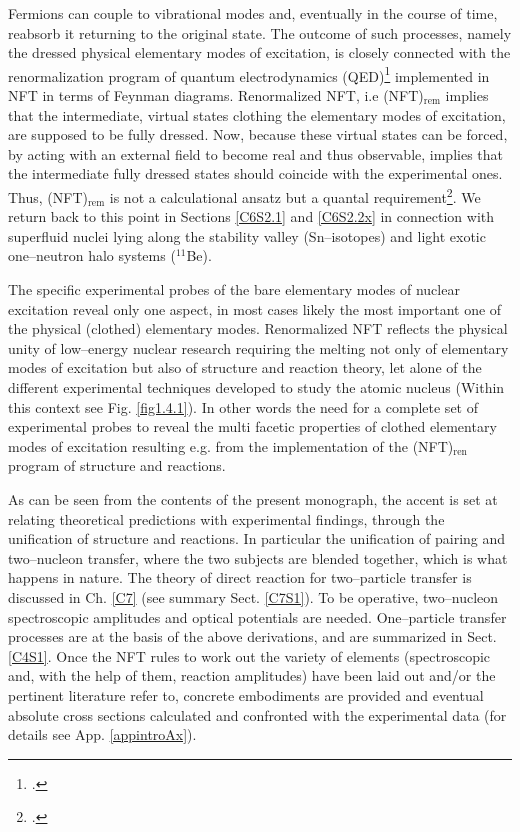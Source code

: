  
 Fermions  can   couple to  vibrational modes and, eventually   in the course of time, reabsorb it returning to the original state. The outcome of such processes, namely the dressed physical elementary modes of excitation, is closely connected with the renormalization program of quantum electrodynamics (QED)\footnote{\cite{Feynman:75,Schwinger:01}.} implemented in NFT in terms of Feynman diagrams. Renormalized NFT, i.e (NFT)$_{\text{rem}}$ implies that the intermediate, virtual states clothing the elementary modes of excitation, are supposed to be fully dressed. Now, because these virtual states can be forced, by acting with an external field to become real and thus observable, implies that the intermediate fully dressed states should coincide with the experimental ones. Thus, (NFT)$_{\text{rem}}$ is not a calculational ansatz but a quantal requirement\footnote{\cite{Broglia:16,Idini:15,Barranco:17}.}. We return back to this point in Sections \ref{C6S2.1} and \ref{C6S2.2x} in connection with superfluid nuclei lying along the stability valley  (Sn--isotopes) and light exotic one--neutron halo systems ($^{11}$Be).
  
 
  The specific experimental probes of the bare elementary modes of nuclear excitation reveal only one aspect, in most cases likely the most important one of the physical (clothed) elementary modes. Renormalized NFT  reflects the physical unity of  low--energy nuclear research requiring the melting not only of elementary modes of excitation but also of structure and reaction theory, let alone of the different experimental techniques developed to study the atomic nucleus (Within this context see  Fig. \ref{fig1.4.1}). In other words the need for a complete set of experimental probes to reveal the multi facetic properties of clothed elementary modes of excitation resulting e.g. from the implementation of the (NFT)$_{\text{ren}}$ program of structure and reactions.


As can be seen from the contents of the present monograph, the accent is set at relating theoretical predictions with experimental findings, through the unification of structure and reactions. In particular the unification of pairing and two--nucleon transfer, where the two subjects are blended together, which is what happens in nature.
The theory of direct reaction for two--particle transfer is discussed in Ch. \ref{C7} (see summary Sect. \ref{C7S1}). To be operative, two--nucleon spectroscopic amplitudes and optical potentials are needed. One--particle transfer processes are at the basis of the above derivations, and are summarized in Sect. \ref{C4S1}. Once the NFT rules to work out the variety of elements (spectroscopic and, with the help of them, reaction amplitudes) have been laid  out and/or the pertinent literature refer to, concrete embodiments are provided and eventual absolute cross sections calculated and confronted with the experimental data (for details see App. \ref{appintroAx}). 


